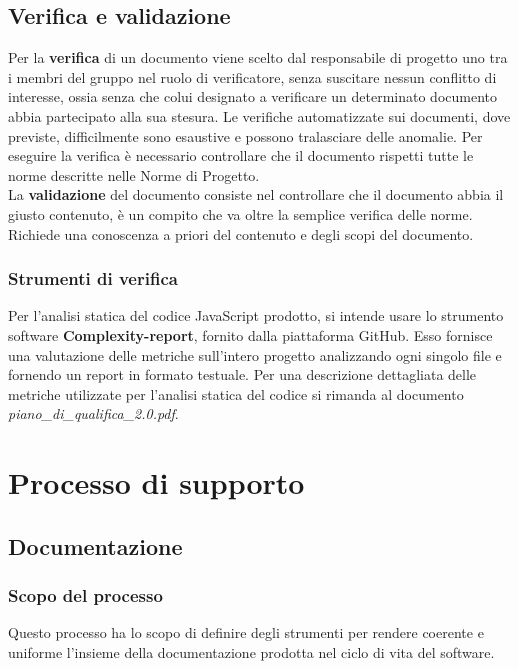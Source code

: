 \documentclass[a4paper,11pt]{article}
\begin{document}
	\subsection{Verifica e validazione}
	Per la \textbf{verifica} di un documento viene scelto dal responsabile di progetto uno tra i membri del gruppo nel ruolo di verificatore, senza suscitare nessun conflitto di interesse, ossia senza che colui designato a verificare un determinato documento abbia partecipato alla sua stesura.
	 Le verifiche automatizzate sui documenti, dove previste, difficilmente sono esaustive e possono tralasciare delle anomalie. Per eseguire la verifica è necessario controllare che il documento rispetti tutte le norme descritte nelle Norme di Progetto. \\
	La \textbf{validazione} del documento consiste nel controllare che il documento abbia il giusto contenuto, è un compito che va oltre la semplice verifica delle norme. Richiede una conoscenza a priori del contenuto e degli scopi del documento.
\subsubsection{Strumenti di verifica}

Per l'analisi statica del codice JavaScript prodotto, si intende usare lo strumento software \textbf{Complexity-report\addglos}, fornito dalla piattaforma GitHub.
Esso fornisce una valutazione delle metriche sull'intero progetto analizzando ogni singolo file e fornendo un report in formato testuale.
Per una descrizione dettagliata delle metriche utilizzate per l'analisi statica del codice si rimanda al documento \textit{piano\_di\_qualifica\_2.0.pdf}.
		
	\section{Processo di supporto}
		\subsection{Documentazione}
		
			\subsubsection{Scopo del processo}
			Questo processo ha lo scopo di definire degli strumenti per rendere coerente e uniforme l'insieme della documentazione prodotta nel ciclo di vita del software.
			
\end{document}
